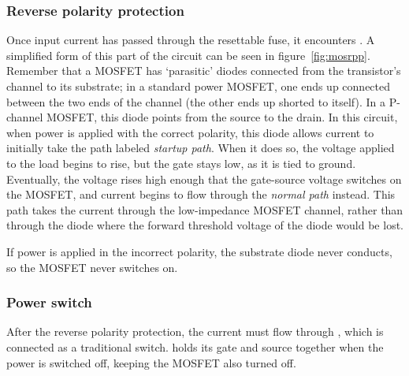 \subsubsection{Reverse polarity protection}

Once input current has passed through the resettable fuse, it encounters
. A simplified form of this part of the circuit can be seen in
figure~\ref{fig:mosrpp}. Remember that a MOSFET has `parasitic' diodes
connected from the transistor's channel to its substrate; in a
standard power MOSFET, one ends up connected between the two ends of the
channel (the other ends up shorted to itself). In a P-channel MOSFET, this
diode points from the source to the drain. In this circuit, when power is
applied with the correct polarity, this diode allows current to initially take
the path labeled \emph{startup path}. When it does so, the voltage applied to
the load begins to rise, but the gate stays low, as it is tied to ground.
Eventually, the voltage rises high enough that the gate-source voltage switches
on the MOSFET, and current begins to flow through the \emph{normal path}
instead. This path takes the current through the low-impedance MOSFET channel,
rather than through the diode where the forward threshold voltage of the diode
would be lost.

If power is applied in the incorrect polarity, the substrate diode never
conducts, so the MOSFET never switches on.

\subsubsection{Power switch}

After the reverse polarity protection, the current must flow through
, which is connected as a traditional switch.  holds
its gate and source together when the power is switched off, keeping the MOSFET
also turned off.

